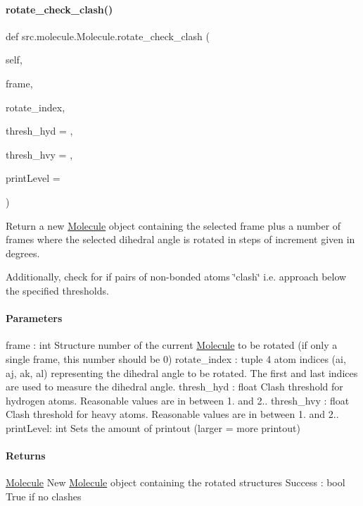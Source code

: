 \paragraph{\texorpdfstring{rotate\+\_\+check\+\_\+clash()}{rotate\_check\_clash()}}
{\footnotesize\ttfamily def src.\+molecule.\+Molecule.\+rotate\+\_\+check\+\_\+clash (\begin{DoxyParamCaption}\item[{}]{self,  }\item[{}]{frame,  }\item[{}]{rotate\+\_\+index,  }\item[{}]{thresh\+\_\+hyd = {},  }\item[{}]{thresh\+\_\+hvy = {},  }\item[{}]{print\+Level = {} }\end{DoxyParamCaption})}



Return a new \hyperlink{classsrc_1_1molecule_1_1Molecule}{Molecule} object containing the selected frame plus a number of frames where the selected dihedral angle is rotated in steps of \textquotesingle{}increment\textquotesingle{} given in degrees. 

Additionally, check for if pairs of non-\/bonded atoms \char`\"{}clash\char`\"{} i.\+e. approach below the specified thresholds.

\paragraph*{Parameters }

frame \+: int Structure number of the current \hyperlink{classsrc_1_1molecule_1_1Molecule}{Molecule} to be rotated (if only a single frame, this number should be 0) rotate\+\_\+index \+: tuple 4 atom indices (ai, aj, ak, al) representing the dihedral angle to be rotated. The first and last indices are used to measure the dihedral angle. thresh\+\_\+hyd \+: float Clash threshold for hydrogen atoms. Reasonable values are in between 1. and 2.. thresh\+\_\+hvy \+: float Clash threshold for heavy atoms. Reasonable values are in between 1. and 2.. print\+Level\+: int Sets the amount of printout (larger = more printout)

\paragraph*{Returns }

\hyperlink{classsrc_1_1molecule_1_1Molecule}{Molecule} New \hyperlink{classsrc_1_1molecule_1_1Molecule}{Molecule} object containing the rotated structures Success \+: bool True if no clashes 

